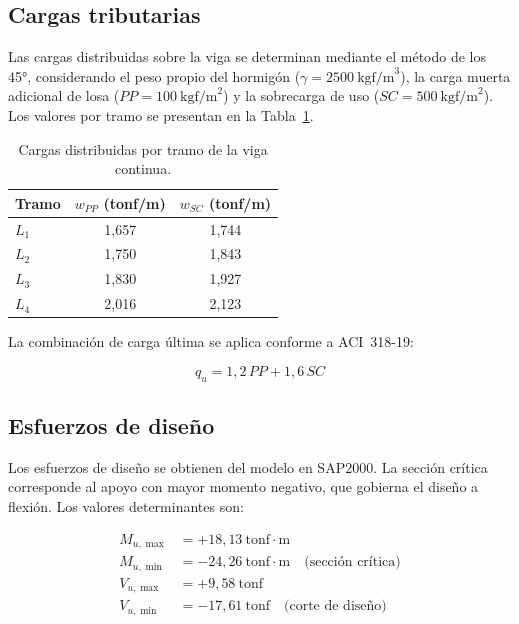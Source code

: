 \subsection{Cargas tributarias}
 
Las cargas distribuidas sobre la viga se determinan mediante el método de los 45°, considerando el peso propio del hormigón ($\gamma = 2500\ \text{kgf/m}^3$), la carga muerta adicional de losa ($PP = 100\ \text{kgf/m}^2$) y la sobrecarga de uso ($SC = 500\ \text{kgf/m}^2$). Los valores por tramo se presentan en la Tabla~\ref{tab:viga-cargas}.
 
\begin{table}[h!]
\centering
\caption{Cargas distribuidas por tramo de la viga continua.}
\label{tab:viga-cargas}
\begin{tabular}{lcc}
\toprule
Tramo & $w_{PP}$ (tonf/m) & $w_{SC}$ (tonf/m) \\
\midrule
$L_1$ & 1{,}657 & 1{,}744 \\
$L_2$ & 1{,}750 & 1{,}843 \\
$L_3$ & 1{,}830 & 1{,}927 \\
$L_4$ & 2{,}016 & 2{,}123 \\
\bottomrule
\end{tabular}
\end{table}
 
La combinación de carga última se aplica conforme a ACI~318-19:
 
\begin{equation}
    q_u = 1{,}2\,PP + 1{,}6\,SC
\end{equation}
 
\subsection{Esfuerzos de diseño}
 
Los esfuerzos de diseño se obtienen del modelo en SAP2000. La sección crítica corresponde al apoyo con mayor momento negativo, que gobierna el diseño a flexión. Los valores determinantes son:
 
\begin{align}
    M_{u,\max} &= +18{,}13\ \text{tonf}{\cdot}\text{m} \\
    M_{u,\min} &= -24{,}26\ \text{tonf}{\cdot}\text{m} \quad \text{(sección crítica)} \\
    V_{u,\max} &= +9{,}58\ \text{tonf} \\
    V_{u,\min} &= -17{,}61\ \text{tonf} \quad \text{(corte de diseño)}
\end{align}
 
